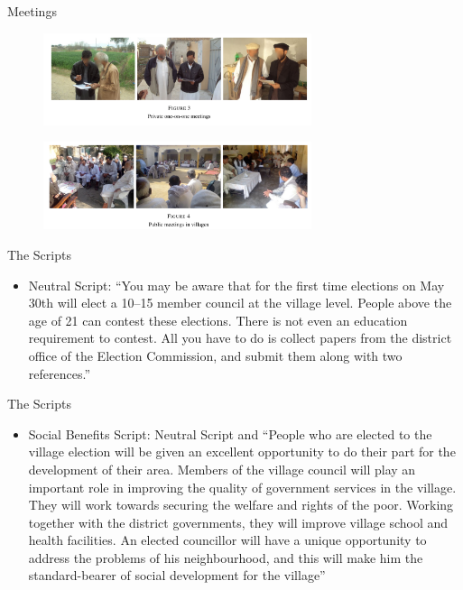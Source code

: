 \documentclass[11pt,notes=hide,aspectratio=169,mathserif]{beamer}
\begin{document}
\begin{frame}{Meetings}
\begin{figure}
\centering
\includegraphics[width=0.7\textwidth]{inputs/fig9.png}
\end{figure}
\begin{figure}
\centering
\includegraphics[width=0.7\textwidth]{inputs/fig10.png}
\end{figure}
\end{frame}

\begin{frame}{The Scripts}
\begin{itemize}
\item Neutral Script: ``You may be aware that for the first time elections on May 30th will elect a 10–15 member council at the village level. People above the age of 21 can contest these elections. There is not even an education requirement to contest. All you have to do is collect papers from the district office of the Election Commission, and submit them along with two references.''
\end{itemize}
\end{frame}

\begin{frame}{The Scripts}
    \begin{itemize}
    \item Social Benefits Script: Neutral Script and ``People who are elected to the village election will be given an excellent opportunity to do their part for the development of their area. Members of the village council will play an important role in improving the quality of government services in the village. They will work towards securing the welfare and rights of the poor. Working together with the district governments, they will improve village school and health facilities. An elected councillor will have a unique opportunity to address the problems of his neighbourhood, and this will make him the standard-bearer of social development for the village''
    \end{itemize}
    \end{frame}
\end{document}
